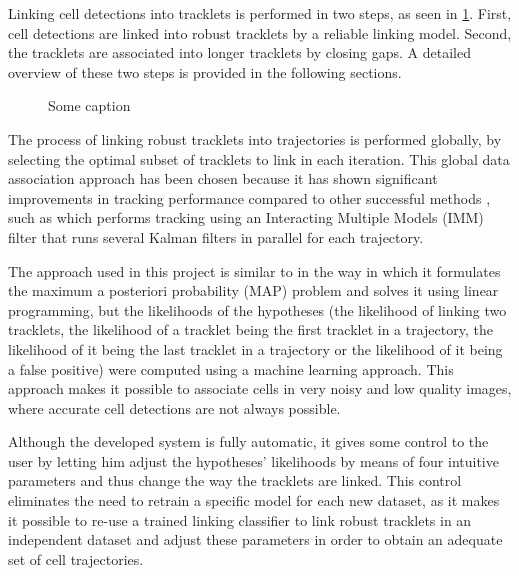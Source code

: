 		Linking cell detections into tracklets is performed in two steps, as seen in \cref{fig:trackingoveriew}. First, cell detections are linked into robust tracklets by a reliable linking model. Second, the tracklets are associated into longer tracklets by closing gaps. A detailed overview of these two steps is provided in the following sections.
	
		\begin{figure}[h]
			\centering
			\caption{Some caption}
			\label{fig:trackingoveriew}
		\end{figure}
		
		The process of linking robust tracklets into trajectories is performed globally, by selecting the optimal subset of tracklets to link in each iteration. This global data association approach has been chosen because it has shown significant improvements in tracking performance compared to other successful methods \cite{bise11global}, such as \cite{li08} which performs tracking using an Interacting Multiple Models (IMM) filter that runs several Kalman filters in parallel for each trajectory.
		
		The approach used in this project is similar to \cite{bise11} in the way in which it formulates the maximum a posteriori probability (MAP) problem and solves it using linear programming, but the likelihoods of the hypotheses (the likelihood of linking two tracklets, the likelihood of a tracklet being the first tracklet in a trajectory, the likelihood of it being the last tracklet in a trajectory or the likelihood of it being a false positive) were computed using a machine learning approach. This approach makes it possible to associate cells in very noisy and low quality images, where accurate cell detections are not always possible.
		
		Although the developed system is fully automatic, it gives some control to the user by letting him adjust the hypotheses' likelihoods by means of four intuitive parameters and thus change the way the tracklets are linked. This control eliminates the need to retrain a specific model for each new dataset, as it makes it possible to re-use a trained linking classifier to link robust tracklets in an independent dataset and adjust these parameters in order to obtain an adequate set of cell trajectories.
		
